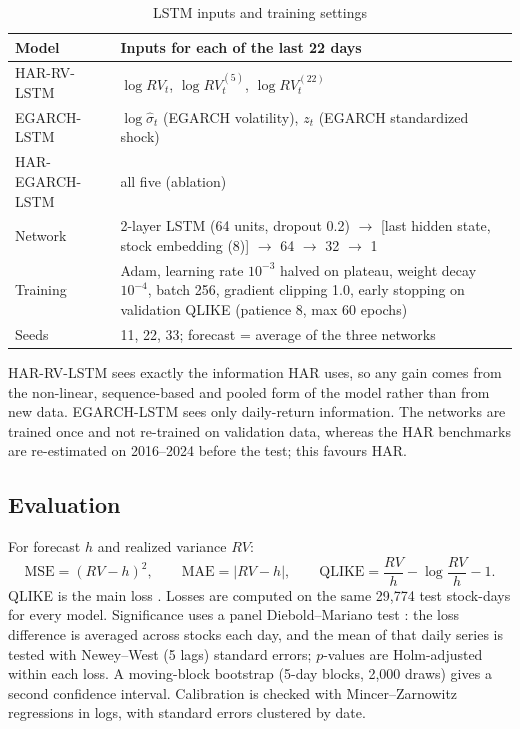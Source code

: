 \documentclass[11pt,a4paper]{article}
\begin{document}
\begin{table}[htbp]
\centering
\caption{LSTM inputs and training settings}
\label{tab:lstm}
\small
\begin{tabularx}{\textwidth}{lX}
\toprule
Model & Inputs for each of the last 22 days \\
\midrule
HAR-RV-LSTM & $\log RV_t$, $\log RV^{(5)}_t$, $\log RV^{(22)}_t$ \\
EGARCH-LSTM & $\log \hat\sigma_t$ (EGARCH volatility), $z_t$ (EGARCH standardized shock) \\
HAR-EGARCH-LSTM & all five (ablation) \\
\midrule
Network & 2-layer LSTM (64 units, dropout 0.2) $\rightarrow$ [last hidden state, stock embedding (8)] $\rightarrow$ 64 $\rightarrow$ 32 $\rightarrow$ 1 \\
Training & Adam, learning rate $10^{-3}$ halved on plateau, weight decay $10^{-4}$, batch 256, gradient clipping 1.0, early stopping on validation QLIKE (patience 8, max 60 epochs) \\
Seeds & 11, 22, 33; forecast = average of the three networks \\
\bottomrule
\end{tabularx}
\end{table}

HAR-RV-LSTM sees exactly the information HAR uses, so any gain comes from the non-linear,
sequence-based and pooled form of the model rather than from new data. EGARCH-LSTM sees only
daily-return information. The networks are trained once and not re-trained on validation data,
whereas the HAR benchmarks are re-estimated on 2016--2024 before the test; this favours HAR.

\subsection{Evaluation}

For forecast $h$ and realized variance $RV$:
\begin{equation}
\text{MSE}=(RV-h)^2,\qquad \text{MAE}=|RV-h|,\qquad \text{QLIKE}=\frac{RV}{h}-\log\frac{RV}{h}-1 .
\end{equation}
QLIKE is the main loss \citep{patton2011}. Losses are computed on the same 29,774 test stock-days for
every model. Significance uses a panel Diebold--Mariano test \citep{diebold1995}: the loss
difference is averaged across stocks each day, and the mean of that daily series is tested with
Newey--West (5 lags) standard errors; $p$-values are Holm-adjusted within each loss. A moving-block
bootstrap (5-day blocks, 2,000 draws) gives a second confidence interval. Calibration is checked with
Mincer--Zarnowitz regressions in logs, with standard errors clustered by date.
\end{document}
